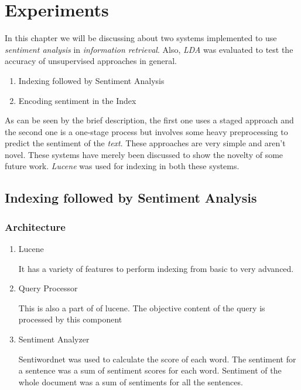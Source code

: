 \chapter{Experiments} %

\label{Chapter5} %



In this chapter we will be discussing about two systems implemented to use \textit{sentiment analysis} in \textit{information retrieval}.
Also, \textit{LDA} was evaluated to test the accuracy of unsupervised approaches in general.

\begin{enumerate}
 \item Indexing followed by Sentiment Analysis
 \item Encoding sentiment in the Index
\end{enumerate}

As can be seen by the brief description, the first one uses a staged approach and the second one is a one-stage process but involves
some heavy preprocessing to predict the sentiment of the \textit{text}. These approaches are very simple and aren't novel.
These systems have merely been discussed to show the novelty of some future work. \textit{Lucene} \citep*{apachelucene} was used for indexing
in both these systems.

\section{Indexing followed by Sentiment Analysis}

\subsection{Architecture}

\begin{enumerate}
 \item Lucene
  \par It has a variety of features to perform indexing from basic to very advanced. 
 \item Query Processor
  \par This is also a part of of lucene. The objective content of the query is processed by this component
 \item Sentiment Analyzer
  \par Sentiwordnet \citep*{sentiwordnet} was used to calculate the score of each word. The sentiment for a sentence was a sum of sentiment scores
  for each word. Sentiment of the whole document was a sum of sentiments for all the sentences. 
\end{enumerate}

